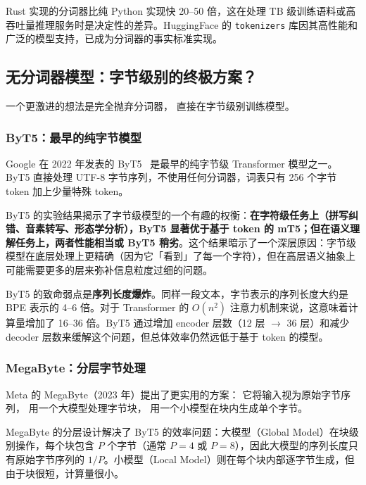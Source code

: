 Rust 实现的分词器比纯 Python 实现快 20--50 倍，这在处理 TB 级训练语料或高吞吐量推理服务时是决定性的差异。HuggingFace 的 \texttt{tokenizers} 库因其高性能和广泛的模型支持，已成为分词器的事实标准实现。

\subsection{无分词器模型：字节级别的终极方案？}

一个更激进的想法是完全抛弃分词器，
直接在字节级别训练模型。

\subsubsection{ByT5：最早的纯字节模型}

Google 在 2022 年发表的 ByT5~\cite{xue2022byt5} 是最早的纯字节级 Transformer 模型之一。ByT5 直接处理 UTF-8 字节序列，不使用任何分词器，词表只有 256 个字节 token 加上少量特殊 token。

ByT5 的实验结果揭示了字节级模型的一个有趣的权衡：\textbf{在字符级任务上（拼写纠错、音素转写、形态学分析），ByT5 显著优于基于 token 的 mT5；但在语义理解任务上，两者性能相当或 ByT5 稍劣}。这个结果暗示了一个深层原因：字节级模型在底层处理上更精确（因为它「看到」了每一个字符），但在高层语义抽象上可能需要更多的层来弥补信息粒度过细的问题。

ByT5 的致命弱点是\textbf{序列长度爆炸}。同样一段文本，字节表示的序列长度大约是 BPE 表示的 4--6 倍。对于 Transformer 的 $O(n^2)$ 注意力机制来说，这意味着计算量增加了 16--36 倍。ByT5 通过增加 encoder 层数（12 层 $\to$ 36 层）和减少 decoder 层数来缓解这个问题，但总体效率仍然远低于基于 token 的模型。

\subsubsection{MegaByte：分层字节处理}

Meta 的 MegaByte（2023 年）提出了更实用的方案：
它将输入视为原始字节序列，
用一个大模型处理字节块，
用一个小模型在块内生成单个字节。

MegaByte 的分层设计解决了 ByT5 的效率问题：大模型（Global Model）在块级别操作，每个块包含 $P$ 个字节（通常 $P = 4$ 或 $P = 8$），因此大模型的序列长度只有原始字节序列的 $1/P$。小模型（Local Model）则在每个块内部逐字节生成，但由于块很短，计算量很小。

